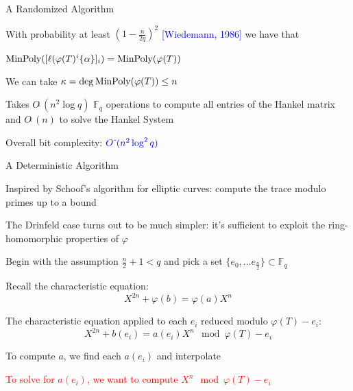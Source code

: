 \documentclass{beamer}
\newcommand{\f}{\mathbb{F}}
\newcommand{\blue}{\textcolor{blue}}
\newcommand{\red}{\textcolor{red}}
\newcommand{\red}{\textnormal{red}}
\begin{document}
\begin{frame}{A Randomized Algorithm}


    \item  With probability at least $(1 - \frac{n}{2q})^2$ \blue{[Wiedemann, 1986]} we have that \item \centerline{$\textnormal{MinPoly}([\ell(\varphi(T)^i\{\alpha\}]_i) = \textnormal{MinPoly}(\varphi(T))$}
    
    \item We can take $\kappa = \deg \textnormal{MinPoly}(\varphi(T)) \leq n$

        \item Takes $O\tilde{~}(n^2 \log q)$ $\f_q$ operations to compute all entries of the Hankel matrix and $O\tilde{~}(n)$ to solve the Hankel System
    \item Overall bit complexity: $\blue{O\tilde{~}(n^2 \log^2 q)}$

\end{frame}


\begin{frame}{A Deterministic Algorithm}


    \item Inspired by Schoof's algorithm for elliptic curves: compute the trace modulo primes up to a bound
    \item The Drinfeld case turns out to be much simpler: it's sufficient to exploit the ring-homomorphic properties of $\varphi$
    \item Begin with the assumption $ \frac{n}{2} + 1 < q$ and pick a set $\{e_0, \ldots e_{\frac{n}{2}}\} \subset \mathbb{F}_q$
    \item Recall the characteristic equation:
    \[X^{2n} + \varphi(b) = \varphi(a) X^n\]
    \item The characteristic equation applied to each $e_i$ reduced modulo $\varphi(T) - e_i$:
    \[ X^{2n} + b(e_i) = a(e_i) X^n  \mod \varphi(T) - e_i \]
    \item To compute $a$, we find each $a(e_i)$ and interpolate
    \item \red{To solve for $a(e_i)$, we want to compute $X^n \mod \varphi(T) - e_i$}

    
\end{frame}
\end{document}
